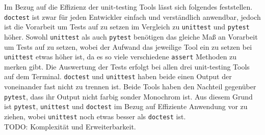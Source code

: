 Im Bezug auf die Effizienz der unit-testing Tools lässt sich folgendes
feststellen. \lstinline{doctest} ist zwar für jeden Entwickler einfach und
verständlich anwendbar, jedoch ist die Vorarbeit um Tests auf zu setzen im
Vergleich zu \lstinline{unittest} und \lstinline{pytest} höher. Sowohl
\lstinline{unittest} als auch \lstinline{pytest} benötigen das gleiche Maß an
Vorarbeit um Tests auf zu setzen, wobei der Aufwand das jeweilige Tool ein zu
setzen bei \lstinline{unittest} etwas höher ist, da es so viele verschiedene
\lstinline{assert} Methoden zu merken gibt. Die Auswertung der Tests erfolgt
bei allen drei unit-testing Tools auf dem Terminal. \lstinline{doctest} und
\lstinline{unittest} haben beide einen Output der voneinander fast nicht zu
trennen ist. Beide Tools haben den Nachteil gegenüber \lstinline{pytest}, dass
ihr Output nicht farbig sonder Monochrom ist.  Aus diesem Grund ist 
\lstinline{pytest}, \lstinline{unittest} und \lstinline{doctest} im Bezug auf
Effiziente Anwendung vor zu ziehen, wobei \lstinline{unittest} noch etwas 
besser als \lstinline{doctest} ist.
\newline
\\
TODO: Komplexität und Erweiterbarkeit.
